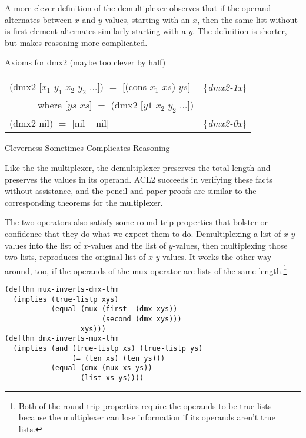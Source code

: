 \begin{aside}
A more clever definition of the demultiplexer
observes that if the operand alternates between $x$ and $y$ values,
starting with an $x$,
then the same list without is first element alternates similarly
starting with a $y$. The definition is shorter,
but makes reasoning more complicated.\\
\begin{center}
Axioms for dmx2 (maybe too clever by half)
\begin{tabular}{ll}
(dmx2 [$x_1$ $y_1$ $x_2$ $y_2$ $\dots$]) $=$ [(cons $x_1$ $xs$) $ys$]  & \{\emph{dmx2-1x}\} \\
~~~~~~where [$ys$ $xs$] $=$ (dmx2 [$y1$ $x_2$ $y_2$ $\dots$])          & \\
(dmx2 nil) $=$ [nil ~ nil]                                             & \{\emph{dmx2-0x}\} \\
\end{tabular}
\end{center}
\caption{Cleverness Sometimes Complicates Reasoning}
\label{aside:dmx-defun-trick}
\end{aside}

Like the the multiplexer,
the demultiplexer preserves the total length
and preserves the values in its operand.
ACL2 succeeds in verifying these facts without assistance,
and the pencil-and-paper proofs are similar to the corresponding
theorems for the multiplexer.

The two operators also satisfy some round-trip properties
that bolster or confidence that they do what we expect them to do.
Demultiplexing a list of $x$-$y$ values into the list of
$x$-values and the list of $y$-values, then multiplexing
those two lists, reproduces the original list of $x$-$y$ values.
It works the other way around, too, if the operands of
the mux operator are lists of the same length.\footnote{Both
of the round-trip properties require the operands to be
true lists because the multiplexer can lose information
if its operands aren't true lists.}

\label{thm:mux-inverts-dmx}
\label{thm:dmx-inverts-mux}
\begin{Verbatim}
(defthm mux-inverts-dmx-thm
  (implies (true-listp xys)
           (equal (mux (first  (dmx xys))
                       (second (dmx xys)))
                  xys)))
(defthm dmx-inverts-mux-thm
  (implies (and (true-listp xs) (true-listp ys)
                (= (len xs) (len ys)))
           (equal (dmx (mux xs ys))
                  (list xs ys))))
\end{Verbatim}

